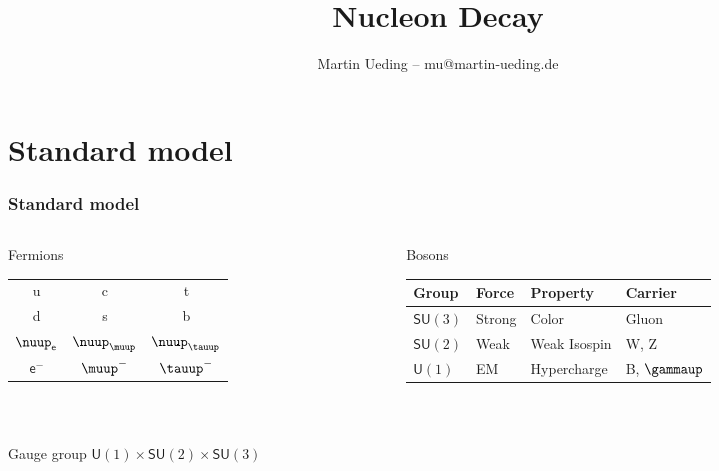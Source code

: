 \documentclass[english, fleqn]{beamer}
\title{Nucleon Decay}
\author{Martin Ueding -- mu@martin-ueding.de}
\begin{document}
\begin{frame}
    \titlepage
\end{frame}

\begin{frame}
    \titlepage
\end{frame}

\section{Standard model}

\begin{frame}
    \frametitle{Standard model}

    \begin{columns}[t]
        \begin{column}{.3\linewidth}
            \begin{block}{Fermions}
                \

                \begin{tabular}{ccc}
                    u & c & t \\
                    d & s & b \\
                    \midrule
                    $\nuup_\mathsf e$ & $\nuup_\muup$ & $\nuup_\tauup$ \\
                    $\mathsf e^-$ & $ \muup^-$ & $\tauup^-$
                \end{tabular}
            \end{block}
        \end{column}
        \begin{column}{.7\linewidth}
            \begin{block}{Bosons}
                \

                \begin{tabular}{llll}
                    Group & Force & Property & Carrier \\
                    \midrule
                    $\mathsf{SU}(3)$ & Strong & Color & Gluon \\
                    $\mathsf{SU}(2)$ & Weak & Weak Isospin & W, Z \\
                    $\mathsf{U}(1)$ & EM & Hypercharge & B, $\gammaup$
                \end{tabular}
            \end{block}
        \end{column}
    \end{columns}

    \

    \begin{block}{Gauge group}
        $\mathsf{U}(1) \times \mathsf{SU}(2) \times \mathsf{SU}(3)$
    \end{block}

\end{frame}
\end{document}
